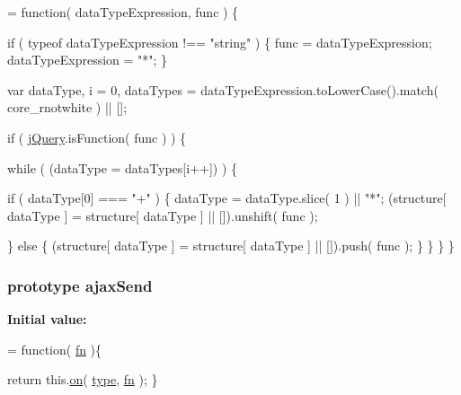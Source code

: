 \begin{DoxyCode}
= \textcolor{keyword}{function}( dataTypeExpression, func ) \{



        \textcolor{keywordflow}{if} ( typeof dataTypeExpression !== \textcolor{stringliteral}{"string"} ) \{
            func = dataTypeExpression;
            dataTypeExpression = \textcolor{stringliteral}{"*"};
        \}

        var dataType,
            i = 0,
            dataTypes = dataTypeExpression.toLowerCase().match( core\_rnotwhite ) || [];

        \textcolor{keywordflow}{if} ( \hyperlink{jquery-1_810_82-vsdoc_8js_add5237586d970a38a81f990e8eb28c6c}{jQuery}.isFunction( func ) ) \{
            
            \textcolor{keywordflow}{while} ( (dataType = dataTypes[i++]) ) \{
                
                \textcolor{keywordflow}{if} ( dataType[0] === \textcolor{stringliteral}{"+"} ) \{
                    dataType = dataType.slice( 1 ) || \textcolor{stringliteral}{"*"};
                    (structure[ dataType ] = structure[ dataType ] || []).unshift( func );

                
                \} \textcolor{keywordflow}{else} \{
                    (structure[ dataType ] = structure[ dataType ] || []).push( func );
                \}
            \}
        \}
    \}
\end{DoxyCode}
\hypertarget{jquery-1_810_82-vsdoc_8js_a558f714e59e1575482b9dce5b917a905}{
\subsubsection[{ajax\-Send}]{ {\bf prototype} ajax\-Send}}\label{jquery-1_810_82-vsdoc_8js_a558f714e59e1575482b9dce5b917a905}
{\bfseries Initial value\-:}
\begin{DoxyCode}
= \textcolor{keyword}{function}( \hyperlink{jquery-1_810_82-vsdoc_8js_acef6bdaf6b9b20fdcca1ea86f0902c3b}{fn} )\{


        \textcolor{keywordflow}{return} this.\hyperlink{jquery-1_810_82-vsdoc_8js_ae453b412b883f60220d73468ef6c6dbc}{on}( \hyperlink{jquery-1_810_82-vsdoc_8js_a3940565e83a9bfd10d95ffd27536da91}{type}, \hyperlink{jquery-1_810_82-vsdoc_8js_acef6bdaf6b9b20fdcca1ea86f0902c3b}{fn} );
    \}
\end{DoxyCode}
